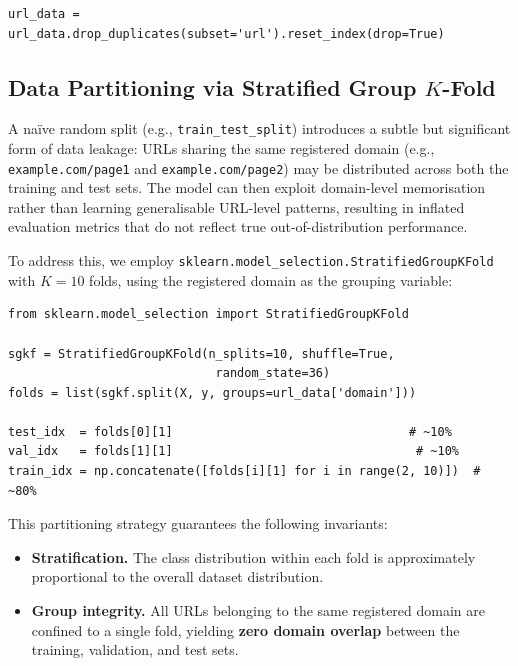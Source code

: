 \documentclass[a4paper,12pt]{article}
\begin{document}
\begin{lstlisting}[caption={Deduplication}]
url_data = url_data.drop_duplicates(subset='url').reset_index(drop=True)
\end{lstlisting}

\subsection{Data Partitioning via Stratified Group $K$-Fold}
\label{sec:split}

A na\"{i}ve random split (e.g., \texttt{train\_test\_split}) introduces a subtle but significant form of data leakage: URLs sharing the same registered domain (e.g., \texttt{example.com/page1} and \texttt{example.com/page2}) may be distributed across both the training and test sets. The model can then exploit domain-level memorisation rather than learning generalisable URL-level patterns, resulting in inflated evaluation metrics that do not reflect true out-of-distribution performance.

To address this, we employ \texttt{sklearn.model\_selection.StratifiedGroupKFold} with $K{=}10$ folds, using the registered domain as the grouping variable:

\begin{lstlisting}[caption={Stratified Group $K$-Fold partitioning}]
from sklearn.model_selection import StratifiedGroupKFold

sgkf = StratifiedGroupKFold(n_splits=10, shuffle=True,
                             random_state=36)
folds = list(sgkf.split(X, y, groups=url_data['domain']))

test_idx  = folds[0][1]                                 # ~10%
val_idx   = folds[1][1]                                  # ~10%
train_idx = np.concatenate([folds[i][1] for i in range(2, 10)])  # ~80%
\end{lstlisting}

This partitioning strategy guarantees the following invariants:
\begin{itemize}
    \item \textbf{Stratification.} The class distribution within each fold is approximately proportional to the overall dataset distribution.
    \item \textbf{Group integrity.} All URLs belonging to the same registered domain are confined to a single fold, yielding \textbf{zero domain overlap} between the training, validation, and test sets.
\end{itemize}
\end{document}
